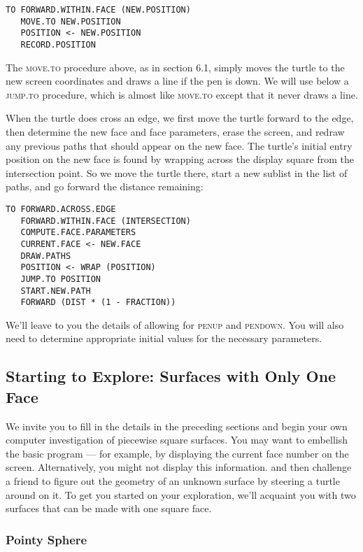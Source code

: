 \documentclass{book}
\begin{document}
\begin{verbatim}
TO FORWARD.WITHIN.FACE (NEW.POSITION)
   MOVE.TO NEW.POSITION
   POSITION <- NEW.POSITION
   RECORD.POSITION
\end{verbatim}
The \textsc{move}\textsc{.to} procedure above, as in section 6.1, simply moves the turtle
to the new screen coordinates and draws a line if the pen is down. We
will use below a \textsc{jump}\textsc{.to} procedure, which is almost like \textsc{move}\textsc{.to} except
that it never draws a line.

When the turtle does cross an edge, we first move the turtle forward
to the edge, then determine the new face and face parameters, erase
the screen, and redraw any previous paths that should appear on the
new face. The turtle's initial entry position on the new face is found by
wrapping across the display square from the intersection point. So we
move the turtle there, start a new sublist in the list of paths, and go
forward the distance remaining:

\begin{verbatim}
TO FORWARD.ACROSS.EDGE
   FORWARD.WITHIN.FACE (INTERSECTION)
   COMPUTE.FACE.PARAMETERS
   CURRENT.FACE <- NEW.FACE
   DRAW.PATHS
   POSITION <- WRAP (POSITION)
   JUMP.TO POSITION
   START.NEW.PATH
   FORWARD (DIST * (1 - FRACTION))
\end{verbatim}
We'll leave to you the details of allowing for \textsc{penup} and \textsc{pendown}. You
will also need to determine appropriate initial values for the necessary
parameters.

\subsection{Starting to Explore: Surfaces with Only One Face}

We invite you to fill in the details in the preceding sections and begin
your own computer investigation of piecewise square surfaces. You may
want to embellish the basic program --- for example, by displaying the
current face number on the screen. Alternatively, you might not display
this information. and then challenge a friend to figure out the geometry
of an unknown surface by steering a turtle around on it. To get you
started on your exploration, we'll acquaint you with two surfaces that
can be made with one square face.

\subsubsection{Pointy Sphere}
\end{document}

